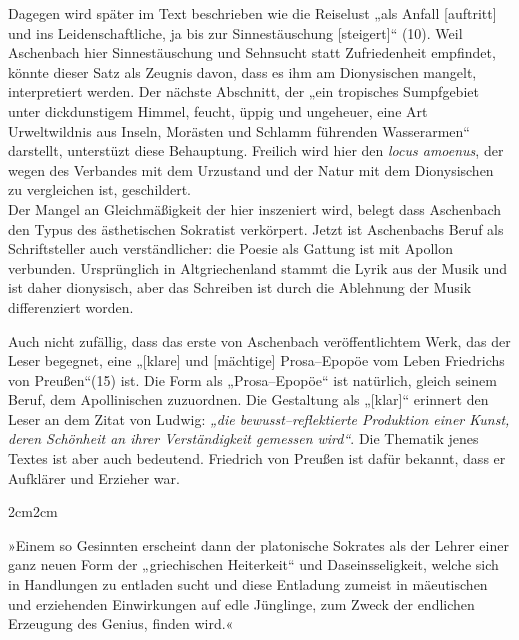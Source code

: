 \documentclass[12pt,a4paper]{article}
\newenvironment{longquote}
{%
    \vspace{-1.5em}
    \begin{adjustwidth}{2cm}{2cm}
        \fontsize{10}{12}\selectfont
        \singlespacing
        \itshape
    }
{%
    \end{adjustwidth}
}
\begin{document}
Dagegen wird später im Text beschrieben wie die Reiselust „als Anfall [auftritt] und ins Leidenschaftliche, ja bis zur Sinnestäuschung [steigert]“ (10). Weil Aschenbach hier Sinnestäuschung und Sehnsucht statt Zufriedenheit empfindet, könnte dieser Satz als Zeugnis davon, dass es ihm am Dionysischen mangelt, interpretiert werden. Der nächste Abschnitt, der „ein tropisches Sumpfgebiet unter dickdunstigem Himmel, feucht, üppig und ungeheuer, eine Art Urweltwildnis aus Inseln, Morästen und Schlamm führenden Wasserarmen“ darstellt, unterstüzt diese Behauptung. Freilich wird hier den \textit{locus amoenus}, der wegen des Verbandes mit dem Urzustand und der Natur mit dem Dionysischen zu vergleichen ist, geschildert.\\
Der Mangel an Gleichmäßigkeit der hier inszeniert wird, belegt dass Aschenbach den Typus des ästhetischen Sokratist verkörpert. Jetzt ist Aschenbachs Beruf als Schriftsteller auch verständlicher: die Poesie als Gattung ist mit Apollon verbunden. Ursprünglich in Altgriechenland stammt die Lyrik aus der Musik und ist daher dionysisch, aber das Schreiben ist durch die Ablehnung der Musik differenziert worden.\par

Auch nicht zufällig, dass das erste von Aschenbach veröffentlichtem Werk, das der Leser begegnet, eine „[klare] und [mächtige] Prosa–Epopöe vom Leben Friedrichs von Preußen“(15) ist. Die Form als „Prosa–Epopöe“ ist natürlich, gleich seinem Beruf, dem Apollinischen zuzuordnen. Die Gestaltung als „[klar]“ erinnert den Leser an dem Zitat von Ludwig: \textit{„die bewusst–reflektierte Produktion einer Kunst, deren Schönheit an ihrer Verständigkeit gemessen wird“}.\autocite[13]{ludwig} Die Thematik jenes Textes ist aber auch bedeutend. Friedrich von Preußen ist dafür bekannt, dass er Aufklärer und Erzieher war.

\begin{longquote}
    »Einem so Gesinnten erscheint dann der platonische Sokrates als der Lehrer einer ganz neuen Form der „griechischen Heiterkeit“ und Daseinsseligkeit, welche sich in Handlungen zu entladen sucht und diese Entladung zumeist in mäeutischen und erziehenden Einwirkungen auf edle Jünglinge, zum Zweck der endlichen Erzeugung des Genius, finden wird.«\autocite[105]{nietzsche1920}
\end{longquote}
\end{document}

